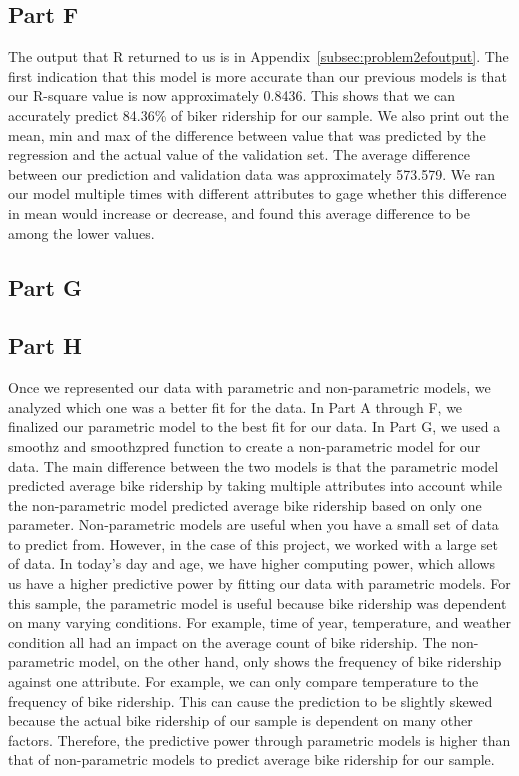 \documentclass[11pt]{article}
\begin{document}
\subsection{Part F}
\label{subsec:2f}
The output that R returned to us is in Appendix~\ref{subsec:problem2efoutput}. The first indication that this model is more accurate than our previous models is that our R-square value is now approximately 0.8436. This shows that we can accurately predict 84.36\% of biker ridership for our sample. We also print out the mean, min and max of the difference between value that was predicted by the regression and the actual value of the validation set. The average difference between our prediction and validation data was approximately 573.579. We ran our model multiple times with different attributes to gage whether this difference in mean would increase or decrease, and found this average difference to be among the lower values. 
\subsection{Part G}
\label{subsec:2g}
\subsection{Part H}
\label{subsec:2h}
Once we represented our data with parametric and non-parametric models, we analyzed which one was a better fit for the data. In Part A through F, we finalized our parametric model to the best fit for our data. In Part G, we used a smoothz and smoothzpred function to create a non-parametric model for our data. The main difference between the two models is that the parametric model predicted average bike ridership by taking multiple attributes into account while the non-parametric model predicted average bike ridership based on only one parameter. Non-parametric models are useful when you have a small set of data to predict from. However, in the case of this project, we worked with a large set of data. In today's day and age, we have higher computing power, which allows us have a higher predictive power by fitting our data with parametric models. For this sample, the parametric model is useful because bike ridership was dependent on many varying conditions. For example, time of year, temperature, and weather condition all had an impact on the average count of bike ridership. The non-parametric model, on the other hand, only shows the frequency of bike ridership against one attribute. For example, we can only compare  temperature to the frequency of bike ridership. This can cause the prediction to be slightly skewed because the actual bike ridership of our sample is dependent on many other factors. Therefore, the predictive power through parametric models is higher than that of non-parametric models to predict average bike ridership for our sample.
\end{document}
